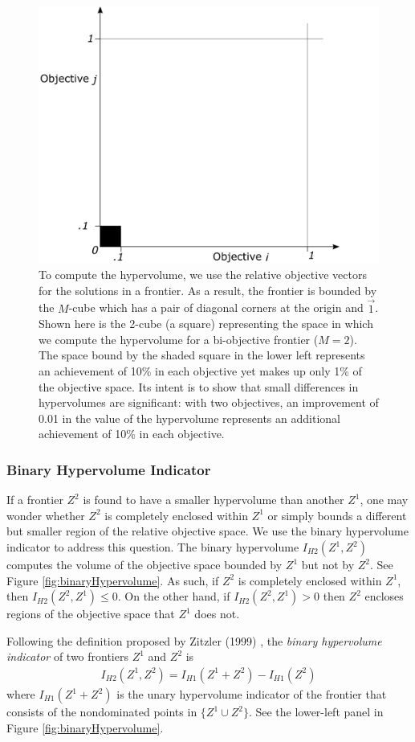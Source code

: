 \begin{figure}
\centering
\includegraphics[width=.5\textwidth]{../images/HypervolumeImprovements}
\caption[Interpreting differences in hypervolumes]{To compute the hypervolume, we use the relative objective vectors for the solutions in a frontier. As a result, the frontier is bounded by the $M$-cube which has a pair of diagonal corners at the origin and $\vec{1}$. Shown here is the 2-cube (a square) representing the space in which we compute the hypervolume for a bi-objective frontier ($M=2$). The space bound by the shaded square in the lower left represents an achievement of 10\% in each objective yet makes up only 1\% of the objective space. Its intent is to show that small differences in hypervolumes are significant: with two objectives, an improvement of 0.01 in the value of the hypervolume represents an additional achievement of 10\% in each objective.}
\label{fig:Hypervol10percent}
\end{figure}

\subsubsection{Binary Hypervolume Indicator}
If a frontier $Z^2$ is found to have a smaller hypervolume than another $Z^1$, one may wonder whether $Z^2$ is completely enclosed within $Z^1$ or simply bounds a different but smaller region of the relative objective space. We use the binary hypervolume indicator to address this question. The binary hypervolume $I_{H2}(Z^1,Z^2)$ computes the volume of the objective space bounded by $Z^1$ but not by $Z^2$. See Figure \ref{fig:binaryHypervolume}. As such, if $Z^2$ is completely enclosed within $Z^1$, then $I_{H2}(Z^2,Z^1) \le 0$. On the other hand, if $I_{H2}(Z^2,Z^1) > 0$ then $Z^2$ encloses regions of the objective space that $Z^1$ does not.

Following the definition proposed by Zitzler (1999) \cite{zitzler1999evolutionary}, the \textit{binary hypervolume indicator} of two frontiers $Z^1$ and $Z^2$ is \cite{zitzler1999evolutionary}
\begin{align}
I_{H2} (Z^1,Z^2) = I_{H1} (Z^1 + Z^2) - I_{H1} (Z^2)
\end{align}
where $I_{H1} (Z^1 + Z^2)$ is the unary hypervolume indicator of the frontier that consists of the nondominated points in $\{Z^1 \cup Z^2\}$. See the lower-left panel in Figure \ref{fig:binaryHypervolume}.

